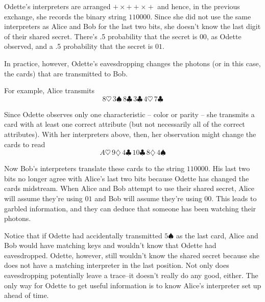 \begin{example}
Odette's interpreters are arranged $+\times++\times+$ and hence, in the previous exchange, she records the binary string $110000$.  Since she did not use the same interpreters as Alice and Bob for the last two bits, she doesn't know the last digit of their shared secret.  There's .5 probability that the secret is $00$, as Odette observed, and a .5 probability that the secret is $01$.

In practice, however, Odette's eavesdropping changes the photons (or in this case, the cards) that are transmitted to Bob.

For example, Alice transmits \[
8\heartsuit \, 3 \spadesuit \, 8 \clubsuit \, 3 \clubsuit \, 4 \heartsuit \, 7 \clubsuit
\]

Since Odette observes only one characteristic -- color or parity -- she transmits a card with at least one correct attribute (but not necessarily all of the correct attributes).  With her interpreters above, then, her observation might change the cards to read 
\[A \heartsuit \, 9 \diamondsuit \, 4 \clubsuit \, 10 \clubsuit \, 8 \diamondsuit \, 4 \spadesuit
\]

Now Bob's interpreters translate these cards to the string $110000$.  His last two bits no longer agree with Alice's last two bits because Odette has changed the cards midstream.  When Alice and Bob attempt to use their shared secret, Alice will assume they're using $01$ and Bob will assume they're using $00$.  This leads to garbled information, and they can deduce that someone has been watching their photons.
\end{example}

Notice that if Odette had accidentally transmitted $5 \spadesuit$ as the last card, Alice and Bob would have matching keys and wouldn't know that Odette had eavesdropped.  Odette, however, still wouldn't know the shared secret because she does not have a matching interpreter in the last position.  Not only does eavesdropping potentially leave a trace--it doesn't really do any good, either.  The only way for Odette to get useful information is to know Alice's interpreter set up ahead of time.